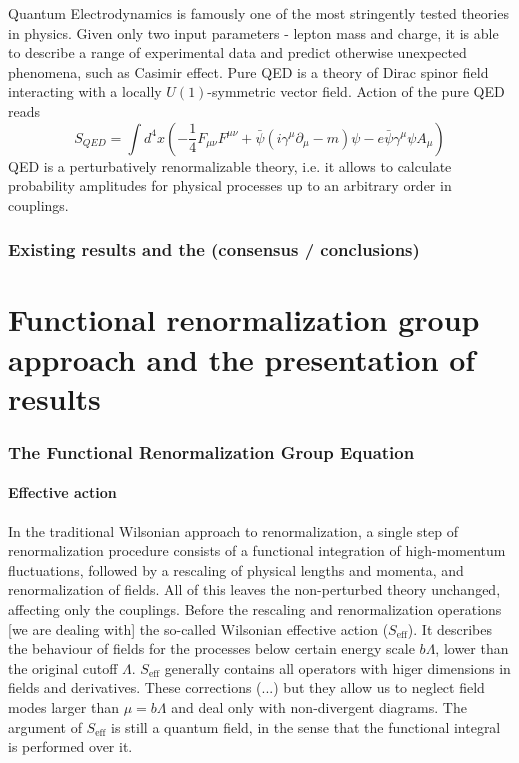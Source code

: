 \documentclass[11pt, a4paper]{article}
\begin{document}
Quantum Electrodynamics is famously one of the most stringently tested theories in physics. Given only two input
parameters - lepton mass and charge, it is able to describe a range of experimental data and predict otherwise
unexpected phenomena, such as Casimir effect. Pure QED is a theory of Dirac spinor field interacting with a locally $U(1)$-symmetric vector field.
Action of the pure QED reads
\begin{equation}
    S_{QED} = \int d^4 x \left( -\frac{1}{4}F_{\mu\nu}F^{\mu\nu} + \bar{\psi}(i \gamma^\mu \partial_\mu - m)\psi - e \bar{\psi} \gamma^\mu \psi A_\mu \right)
\end{equation}
QED is a perturbatively renormalizable theory, i.e. it allows to calculate probability amplitudes for physical processes
up to an arbitrary order in couplings.

\section{Existing results and the (consensus / conclusions)}

\part{Functional renormalization group approach and the presentation of results}

\section{The Functional Renormalization Group Equation}

\subsection*{\centering Effective action}

In the traditional Wilsonian approach to renormalization, a single step of renormalization procedure consists of
a functional integration of high-momentum fluctuations, followed by a rescaling of physical lengths and momenta, and
renormalization of fields. All of this leaves the non-perturbed theory unchanged, affecting only the couplings.
Before the rescaling and renormalization operations [we are dealing with] the so-called Wilsonian effective action ($S_{\text{eff}}$).
It describes the behaviour of fields for the processes below certain energy scale $b\Lambda$, lower than the original cutoff $\Lambda$.
$S_{\text{eff}}$ generally contains all operators with higer dimensions in fields and derivatives.
These corrections (...) but they allow us to neglect field modes larger than $\mu = b\Lambda$ and deal only with non-divergent diagrams.
The argument of $S_{\text{eff}}$ is still a quantum field, in the sense that the functional integral is performed over it. %
\end{document}
